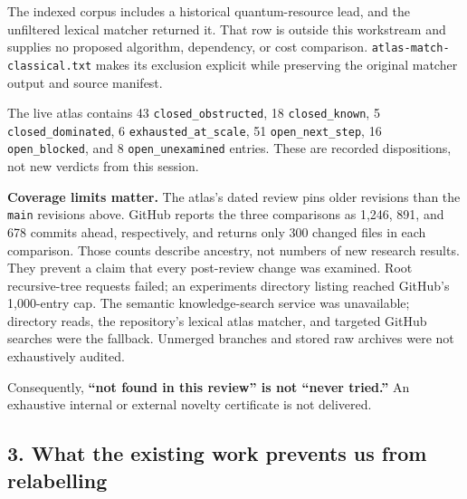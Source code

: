 \documentclass[
  10pt,
]{article}
\begin{document}
The indexed corpus includes a historical quantum-resource lead, and the
unfiltered lexical matcher returned it. That row is outside this
workstream and supplies no proposed algorithm, dependency, or cost
comparison. \texttt{atlas-match-classical.txt} makes its exclusion
explicit while preserving the original matcher output and source
manifest.

The live atlas contains 43 \texttt{closed\_obstructed}, 18
\texttt{closed\_known}, 5 \texttt{closed\_dominated}, 6
\texttt{exhausted\_at\_scale}, 51 \texttt{open\_next\_step}, 16
\texttt{open\_blocked}, and 8 \texttt{open\_unexamined} entries. These
are recorded dispositions, not new verdicts from this session.

\textbf{Coverage limits matter.} The atlas's dated review pins older
revisions than the \texttt{main} revisions above. GitHub reports the
three comparisons as 1,246, 891, and 678 commits ahead, respectively,
and returns only 300 changed files in each comparison. Those counts
describe ancestry, not numbers of new research results. They prevent a
claim that every post-review change was examined. Root recursive-tree
requests failed; an experiments directory listing reached GitHub's
1,000-entry cap. The semantic knowledge-search service was unavailable;
directory reads, the repository's lexical atlas matcher, and targeted
GitHub searches were the fallback. Unmerged branches and stored raw
archives were not exhaustively audited.

Consequently, \textbf{``not found in this review'' is not ``never
tried.''} An exhaustive internal or external novelty certificate is not
delivered.

\subsection{3. What the existing work prevents us from
relabelling}\label{what-the-existing-work-prevents-us-from-relabelling}
\end{document}
